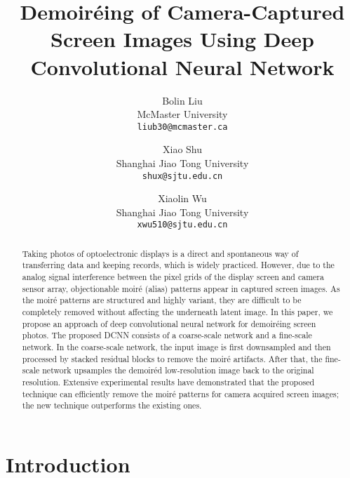 \documentclass[10pt,twocolumn,letterpaper]{article}
\begin{document}
\title{Demoir\'eing of Camera-Captured Screen Images Using Deep
  Convolutional Neural Network}

\author{Bolin Liu\\
	McMaster University\\
	{\tt\small liub30@mcmaster.ca}
	\and
	Xiao Shu\\
	Shanghai Jiao Tong University\\
	{\tt\small shux@sjtu.edu.cn}
	\and
	Xiaolin Wu\\
	Shanghai Jiao Tong University\\
	{\tt\small xwu510@sjtu.edu.cn}
}

\date{}

\maketitle
\thispagestyle{empty}

\begin{abstract}
  Taking photos of optoelectronic displays is a direct and spontaneous
  way of transferring data and keeping records, which is widely
  practiced.  However, due to the analog signal interference between
  the pixel grids of the display screen and camera sensor array,
  objectionable moir\'e (alias) patterns appear in captured screen
  images.  As the moir\'e patterns are structured and highly variant,
  they are difficult to be completely removed without affecting the
  underneath latent image.  In this paper, we propose an approach of
  deep convolutional neural network for demoir\'eing screen photos.
  The proposed DCNN consists of a coarse-scale network and a
  fine-scale network.  In the coarse-scale network, the input image is
  first downsampled and then processed by stacked residual blocks to
  remove the moir\'e artifacts.  After that, the fine-scale network
  upsamples the demoir\'ed low-resolution image back to the original
  resolution.  Extensive experimental results have demonstrated that
  the proposed technique can efficiently remove the moir\'e patterns
  for camera acquired screen images; the new technique outperforms the
  existing ones.
\end{abstract}




\section{Introduction}
\label{sec:introduction}
\end{document}
